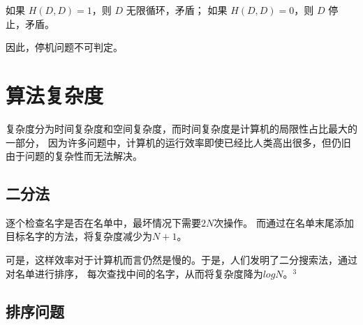 \documentclass[UTF-8,a4paper,9pt]{article}
\begin{document}
如果 $H(D, D) = 1$，则 $D$ 无限循环，矛盾；
如果 $H(D, D) = 0$，则 $D$ 停止，矛盾。

因此，停机问题不可判定。

\section{算法复杂度}

复杂度分为时间复杂度和空间复杂度，而时间复杂度是计算机的局限性占比最大的一部分，
因为许多问题中，计算机的运行效率即使已经比人类高出很多，但仍旧由于问题的复杂性而无法解决。

\subsection{二分法}

逐个检查名字是否在名单中，最坏情况下需要$2N$次操作。
而通过在名单末尾添加目标名字的方法，将复杂度减少为$N+1$。

可是，这样效率对于计算机而言仍然是慢的。于是，人们发明了二分搜索法，通过对名单进行排序，
每次查找中间的名字，从而将复杂度降为$logN$。$^3$

\subsection{排序问题}
\end{document}
